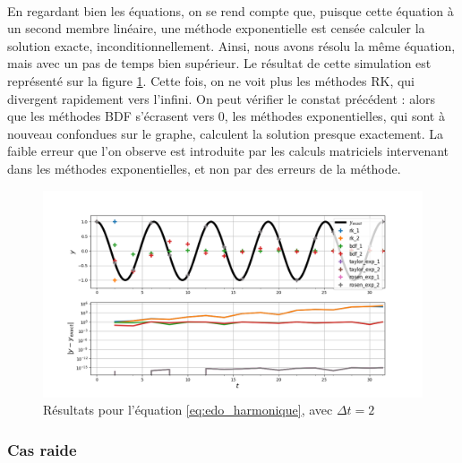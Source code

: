         \paragraph{}
        En regardant bien les équations, on se rend compte que, puisque cette équation à un second membre linéaire, une méthode exponentielle est censée calculer la solution exacte, inconditionnellement. Ainsi, nous avons résolu la même équation, mais avec un pas de temps bien supérieur. Le résultat de cette simulation est représenté sur la figure \ref{fig:edo_harmonique_2}. Cette fois, on ne voit plus les méthodes RK, qui divergent rapidement vers l'infini. On peut vérifier le constat précédent : alors que les méthodes BDF s'écrasent vers 0, les méthodes exponentielles, qui sont à nouveau confondues sur le graphe, calculent la solution presque exactement. La faible erreur que l'on observe est introduite par les calculs matriciels intervenant dans les méthodes exponentielles, et non par des erreurs de la méthode.
        \begin{figure}[H]
            \centering
            \includegraphics[trim = 0cm 0cm 0cm 1cm, clip, width=\textwidth]{images/resultats/edo_sine_large_dt.png}
            \caption{Résultats pour l'équation \ref{eq:edo_harmonique}, avec $\Delta t = 2$}
            \label{fig:edo_harmonique_2}
        \end{figure}

    \subsubsection{Cas raide}
